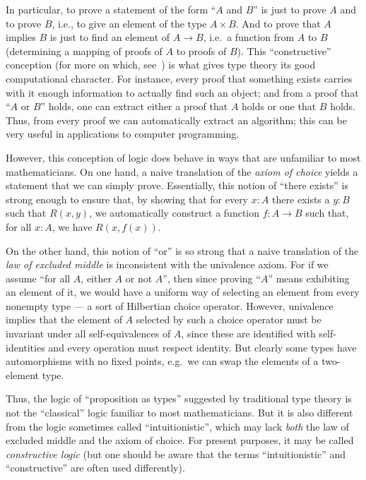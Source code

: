 In particular, to prove a statement of the form ``$A$ and $B$'' is just to prove $A$ and to prove $B$, i.e., to give an element of the type $A\times B$.
And to prove that $A$ implies $B$ is just to find an element of $A\to B$, i.e.\ a function from $A$ to $B$ (determining a mapping of proofs of $A$ to proofs of $B$).
This ``constructive'' conception (for more on which, see~\cite{kolmogorov,TroelstraI,TroelstraII}) is what gives type theory its good 
computational character.
For instance, every proof that something exists carries with it enough information to actually find such an object; and from a proof that  ``$A$ or $B$'' holds, one can extract either a proof that $A$ holds or one that $B$ holds.
Thus, from every proof we can automatically extract an algorithm; this can be very useful in applications to computer programming.

However, this conception of logic does behave in ways that are unfamiliar to most mathematicians.
On one hand, a naive translation of the \emph{axiom of choice} yields a statement that we can simply prove.
Essentially, this notion of ``there exists'' is strong enough to ensure that, by showing that for every $x: A$ there exists a $y:B$ such that $R(x,y)$, we automatically construct a function $f : A\to B$ such that, for all $x:A$, we have $R(x, f(x))$.

On the other hand, this notion of ``or'' is so strong that a naive translation of the \emph{law of excluded middle} is inconsistent with the univalence axiom.
For if we assume ``for all $A$, either $A$ or not $A$'', then since proving ``$A$'' means exhibiting an element of it, we would have a uniform way of selecting an element from every nonempty type --- a sort of Hilbertian choice operator.
However, univalence implies that the element of $A$ selected by such a choice operator must be invariant under all self-equivalences of $A$, since these are identified with self-identities and every operation must respect identity.
But clearly some types have automorphisms with no fixed points, e.g.\ we can swap the elements of a two-element type.

Thus, the logic of ``proposition as types'' suggested by traditional type theory is not the ``classical'' logic familiar to most mathematicians.
But it is also different from the logic sometimes called ``intuitionistic'', which may lack \emph{both} the law of excluded middle and the axiom of choice. For present purposes, it may be called \emph{constructive logic} (but one should be aware that the terms  ``intuitionistic'' and ``constructive'' are often used differently).

